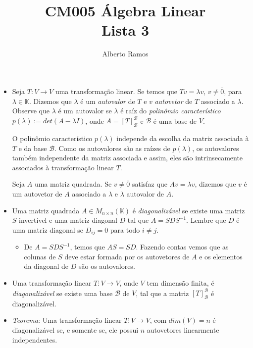 \documentclass[10pt]{article}
\theoremstyle{plain}
\theoremstyle{obs}
\numberwithin{equation}{section}
\begin{document}
\title{ CM005 Álgebra Linear \\
Lista 3 }
\begin{centering}
\author{ Alberto Ramos }
\end{centering}
\date{ }
\maketitle

 \begin{itemize}
   \item 
   Seja $T: V \rightarrow V$ uma transformação linear. Se temos que $Tv=\lambda v$, $v\neq\bar{0}$, para 
   $\lambda \in \mathbb{K}$. Dizemos  
   que $\lambda$ é um {\it autovalor} de $T$ e $v$ {\it autovetor} de $T$ associado a $\lambda$.
   Observe que $\lambda$ é um autovalor se $\lambda$ é raíz do {\it polinômio característico} 
   $p(\lambda):=det(A-\lambda I)$, onde $A=[T]_{\mathcal{B}}^{\mathcal{B}}$ e 
   $\mathcal{B}$ é uma base de $V$. 
   
   O polinômio característico $p(\lambda)$ independe da escolha da matriz associada 
   à $T$ e da base $\mathcal{B}$. Como os autovalores são as raízes de $p(\lambda)$, 
   os autovalores também independente da matriz associada e assim, eles são intrinsecamente 
   associados à transformação linear $T$.
   
   Seja $A$ uma matriz quadrada. Se $v\neq \bar{0}$ satisfaz que $Av=\lambda v$, 
   dizemos que $v$ é um autovetor de 
   $A$ associado a $\lambda$ e $\lambda$ autovalor de $A$.
   
   \item  Uma matriz quadrada $A \in M_{n \times n}(\mathbb{K})$
   é {\it diagonalizável} se existe uma matriz $S$ invertível e uma matriz diagonal $D$
   tal que $A=SDS^{-1}$. Lembre que $D$ é uma matriz diagonal se $D_{ij}=0$ para todo $i\neq j$.
     \begin{itemize}
      \item De $A=SDS^{-1}$, temos que $AS=SD$. Fazendo contas vemos que 
      as colunas de $S$ deve estar formada por os autovetores de $A$ e os elementos 
      da diagonal de $D$ são os autovalores. 
     \end{itemize}
   \item Uma transformação linear 
   $T: V \rightarrow V$, onde $V$ tem dimensão finita, é {\it diagonalizável}
   se existe uma base $\mathcal{B}$ de $V$, tal que a matriz $[T]_{\mathcal{B}}^{\mathcal{B}}$
   é diagonalizável.
 
   \item {\it Teorema:} Uma transformação linear 
   $T: V \rightarrow V$, com $dim(V)=n$ é diagonalizável
se, e somente se, ele possui $n$ autovetores linearmente independentes. 


\end{itemize}
\end{document}
